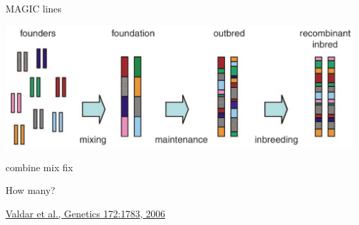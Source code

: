 \documentclass[12pt]{article}
\newcommand{\citesize}{\fontsize{14}{18} \selectfont}
\newcommand{\headsize}{\fontsize{35}{35} \selectfont}
\newcommand{\smallsize}{\fontsize{25}{30} \selectfont}
\newcommand{\smallersize}{\fontsize{20}{25} \selectfont}
\begin{document}
\addtocounter{page}{-1}

\headsize \color{myyellow}
\hfill \begin{minipage}{5.75in}
\centering
MAGIC lines
\end{minipage}

\vspace{20mm}

\centerline{\includegraphics[width=10in]{Figs/valdar_genet2006.png}}

\smallsize \color{myyellow}
\hspace*{52mm} combine \hspace*{35mm} mix \hspace*{52mm} fix

\smallersize
\color{mywhite}
\vspace{20pt}

\hspace*{6mm}
\begin{minipage}[t]{45mm}
\vspace*{0mm}
\centering

How many? \\[20pt]

\end{minipage}
\hspace{57mm}
\begin{minipage}[t]{45mm}
\vspace*{0mm}
\centering


\end{minipage}
\hspace{18mm}
\begin{minipage}[t]{45mm}
\vspace*{0mm}
\centering


\end{minipage}


\vfill

\hfill {\citesize \color{citecolor} \href{http://www.genetics.org/content/172/3/1783.full}{Valdar et al., Genetics 172:1783, 2006}}

\vspace*{5mm}
\end{document}
